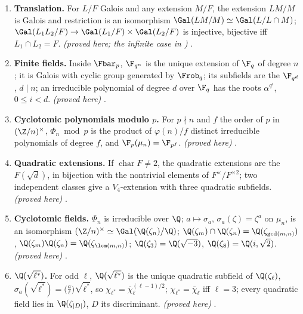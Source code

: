 \begin{enumerate}[label=\textbf{\thechapter.\arabic*}]
bijections; $[M:F]$ is the index of $\Gal(L/M)$; $\Gal(L/\sigma M)=\sigma\Gal(L/M)\sigma^{-1}$; $M/F$ is Galois iff $\Gal(L/M)$ is normal in $G$,
and then $G/\Gal(L/M)\simeq\Gal(M/F)$. \emph{(proved here)} .
\item \textbf{Translation.} For $L/F$ Galois and any extension $M/F$, the extension $LM/M$ is Galois and restriction is an isomorphism
$\Gal(LM/M)\simeq\Gal(L/L\cap M)$;
$\Gal(L_1L_2/F)\to\Gal(L_1/F)\times\Gal(L_2/F)$ is injective, bijective iff $L_1\cap L_2=F$. \emph{(proved here; the infinite case in
)} .
\item \textbf{Finite fields.} Inside $\Fbar_p$, $\F_{q^n}$ is the unique extension of $\F_q$ of degree $n$; it is Galois with cyclic group generated
by $\Frob_q$; its subfields are the $\F_{q^d}$, $d\mid n$; an irreducible polynomial of degree $d$ over $\F_q$ has the roots $\alpha^{q^i}$,
$0\le i<d$. \emph{(proved here)} .
\item \textbf{Cyclotomic polynomials modulo $p$.} For $p\nmid n$ and $f$ the order of $p$ in $(\Z/n)^\times$, $\Phi_n\bmod p$ is the product of
$\varphi(n)/f$ distinct irreducible polynomials of degree $f$, and $\F_p(\mu_n)=\F_{p^f}$. \emph{(proved here)} .
\item \textbf{Quadratic extensions.} If $\operatorname{char}F\ne2$, the quadratic extensions are the $F(\sqrt d)$, in bijection with the nontrivial elements
of $F^\times/F^{\times2}$; two independent classes give a $V_4$-extension with three quadratic subfields. \emph{(proved here)} .
\item \textbf{Cyclotomic fields.} $\Phi_n$ is irreducible over $\Q$; $a\mapsto\sigma_a$, $\sigma_a(\zeta)=\zeta^a$ on $\mu_n$, is an isomorphism
$(\Z/n)^\times\simeq\Gal(\Q(\zeta_n)/\Q)$; $\Q(\zeta_m)\cap\Q(\zeta_n)=\Q(\zeta_{\gcd(m,n)})$, $\Q(\zeta_m)\Q(\zeta_n)=\Q(\zeta_{\lcm(m,n)})$;
$\Q(\zeta_3)=\Q(\sqrt{-3})$, $\Q(\zeta_8)=\Q(i,\sqrt2)$. \emph{(proved here)} .
\item \textbf{$\Q(\sqrt{\ell^*})$.} For odd $\ell$, $\Q(\sqrt{\ell^*})$ is the unique quadratic subfield of $\Q(\zeta_\ell)$, $\sigma_a(\sqrt{\ell^*})=
\bigl(\frac a\ell\bigr)\sqrt{\ell^*}$, so $\chi_{\ell^*}=\bar\chi_\ell^{(\ell-1)/2}$; $\chi_{\ell^*}=\bar\chi_\ell$ iff $\ell=3$; every quadratic field lies in
$\Q(\zeta_{|D|})$, $D$ its discriminant. \emph{(proved here)} .

\end{enumerate}
